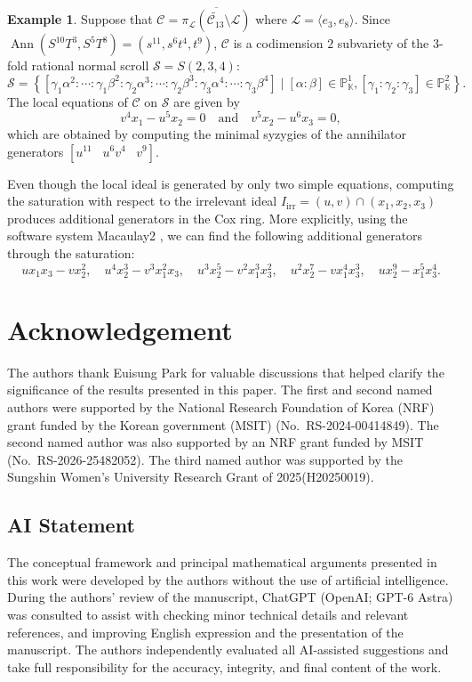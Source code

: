 \documentclass[a4paper, 11pt]{amsart}
\numberwithin{theorem}{section}
\theoremstyle{definition}
\newtheorem{example}[theorem]{Example}
\numberwithin{equation}{section}
\begin{document}
\begin{example}
Suppose that $\mathcal{C} = \overline{\pi_{\mathcal{L}}(\widetilde{\mathcal{C}_{13}}\setminus \mathcal{L})}$ where $\mathcal{L} = \langle e_3, e_8 \rangle$.
Since $\operatorname{Ann}(S^{10}T^3, S^5T^8) = (s^{11}, s^6t^4, t^9)$, $\mathcal{C}$ is a codimension $2$ subvariety of the $3$-fold rational normal scroll $\mathcal{S} = S(2,3,4)$:
{\footnotesize
\[
\mathcal{S} = \left\{ [\gamma_1\alpha^2 : \cdots : \gamma_1\beta^2 : \gamma_2\alpha^3 : \cdots : \gamma_2\beta^3 : \gamma_3\alpha^4 : \cdots : \gamma_3\beta^4] \mid [\alpha:\beta] \in \mathbb{P}_{\mathbb{K}}^1, [\gamma_1:\gamma_2:\gamma_3] \in \mathbb{P}_{\mathbb{K}}^2 \right\}.
\]}
The local equations of $\mathcal{C}$ on $\mathcal{S}$ are given by
\[
v^4x_1 - u^5x_2 = 0 \quad \text{and} \quad v^5x_2 - u^6x_3 = 0,
\]
which are obtained by computing the minimal syzygies of the annihilator generators $[u^{11}\;\;\; u^6v^4\;\;\; v^9]$.

Even though the local ideal is generated by only two simple equations, computing the saturation with respect to the irrelevant ideal $I_{\mathrm{irr}} = (u,v) \cap (x_1,x_2,x_3)$ produces additional generators in the Cox ring.
More explicitly, using the software system Macaulay2 \cite{M2}, we can find the following additional generators through the saturation:
\[
u x_1 x_3 - v x_2^2, \quad u^4 x_2^3 - v^3 x_1^2 x_3, \quad u^3 x_2^5 - v^2 x_1^3 x_3^2, \quad u^2 x_2^7 - v x_1^4 x_3^3, \quad u x_2^9 - x_1^5 x_3^4.
\]
\end{example}

\section*{Acknowledgement}
The authors thank Euisung Park for valuable discussions that helped clarify the significance of the results presented in this paper.
The first and second named authors were supported by the National Research Foundation of Korea (NRF) grant funded by the Korean government (MSIT) (No.~RS-2024-00414849).
The second named author was also supported by an NRF grant funded by MSIT (No.~RS-2026-25482052).
The third named author was supported by the Sungshin Women’s University Research Grant of 2025(H20250019).

\subsection*{AI Statement}
The conceptual framework and principal mathematical arguments presented in this work were developed by the authors without the use of artificial intelligence.
During the authors' review of the manuscript, ChatGPT (OpenAI; GPT-6 Astra) was consulted to assist with checking minor technical details and relevant references, and improving English expression and the presentation of the manuscript.
The authors independently evaluated all AI-assisted suggestions and take full responsibility for the accuracy, integrity, and final content of the work.



\end{document}
